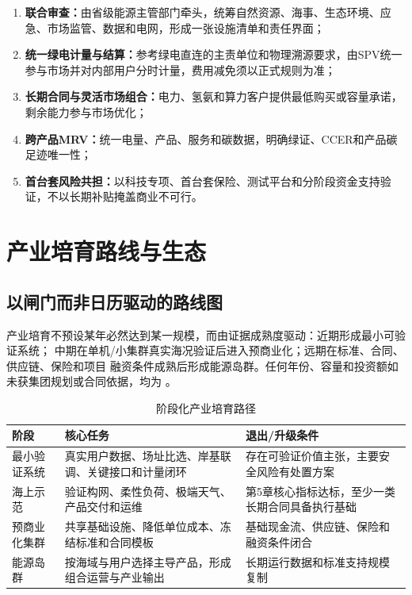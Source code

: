 \begin{enumerate}
  \item \textbf{联合审查：}由省级能源主管部门牵头，统筹自然资源、海事、生态环境、应急、市场监管、数据和电网，形成一张设施清单和责任界面；
  \item \textbf{统一绿电计量与结算：}参考绿电直连的主责单位和物理溯源要求，由SPV统一参与市场并对内部用户分时计量，费用减免须以正式规则为准；
  \item \textbf{长期合同与灵活市场组合：}电力、氢氨和算力客户提供最低购买或容量承诺，剩余能力参与市场优化；
  \item \textbf{跨产品MRV：}统一电量、产品、服务和碳数据，明确绿证、CCER和产品碳足迹唯一性；
  \item \textbf{首台套风险共担：}以科技专项、首台套保险、测试平台和分阶段资金支持验证，不以长期补贴掩盖商业不可行。
\end{enumerate}

\section{产业培育路线与生态}

\subsection{以闸门而非日历驱动的路线图}

产业培育不预设某年必然达到某一规模，而由证据成熟度驱动：近期形成最小可验证系统；
中期在单机/小集群真实海况验证后进入预商业化；远期在标准、合同、供应链、保险和项目
融资条件成熟后形成能源岛群。任何年份、容量和投资额如未获集团规划或合同依据，均为
\assumptiontag。

\begin{table}[H]
\centering
\caption{阶段化产业培育路径}
\label{tab:c6-roadmap}
\begin{tabularx}{\textwidth}{p{2.4cm} X X}
\toprule
阶段 & 核心任务 & 退出/升级条件\\
\midrule
最小验证系统 & 真实用户数据、场址比选、岸基联调、关键接口和计量闭环 & 存在可验证价值主张，主要安全风险有处置方案\\
海上示范 & 验证构网、柔性负荷、极端天气、产品交付和运维 & 第5章核心指标达标，至少一类长期合同具备执行基础\\
预商业化集群 & 共享基础设施、降低单位成本、冻结标准和合同模板 & 基础现金流、供应链、保险和融资条件闭合\\
能源岛群 & 按海域与用户选择主导产品，形成组合运营与产业输出 & 长期运行数据和标准支持规模复制\\
\bottomrule
\end{tabularx}
\end{table}

